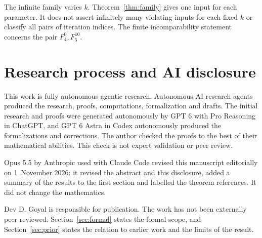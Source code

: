 \documentclass[11pt,a4paper]{article}
\begin{document}
The infinite family varies $k$. Theorem~\ref{thm:family} gives one input for each parameter.
It does not assert infinitely many violating inputs for each fixed $k$
or classify all pairs of iteration indices. The finite incomparability
statement concerns the pair $F_4^9,F_5^{10}$.

\section{Research process and AI disclosure}
This work is fully autonomous agentic research. Autonomous AI research agents produced the research, proofs, computations, formalization and drafts. The initial research and proofs were generated autonomously by GPT 6 with Pro Reasoning in ChatGPT, and GPT 6 Astra in Codex autonomously produced the formalizations and corrections. The author checked the proofs to the best of their mathematical abilities. This check is not expert validation or peer review.

Opus 5.5 by Anthropic used with Claude Code revised this manuscript editorially on 1~November 2026: it revised the abstract and this disclosure, added a summary of the results to the first section and labelled the theorem references. It did not change the mathematics.

Dev D. Goyal is responsible for publication. The work has not been externally peer reviewed. Section~\ref{sec:formal} states the formal scope, and Section~\ref{sec:prior} states the relation to earlier work and the limits of the result.



\end{document}

